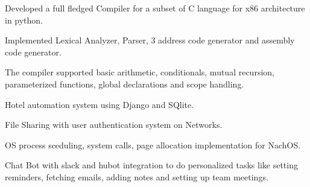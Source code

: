 \documentclass[]{deedy-resume-openfont}
\begin{document}
\begin{minipage}[t]{0.69\textwidth}

\begin{tightemize}
\item Developed a full fledged Compiler for a subset of C language for x86 architecture in python.
\item Implemented Lexical Analyzer, Parser, 3 address code generator and assembly code generator.
\item The compiler supported basic arithmetic, conditionals, mutual recursion, parameterized functions, global declarations and scope handling.
\end{tightemize}




\begin{tightemize}
\item Hotel automation system using Django and SQlite.
\item File Sharing with user authentication system on Networks.
\item OS process sceduling, system calls, page allocation implementation for NachOS.
\item Chat Bot with slack and hubot integration to do personalized tasks like setting reminders, fetching emails, adding notes and setting up team meetings.
\end{tightemize}


\end{minipage}
\end{document}
